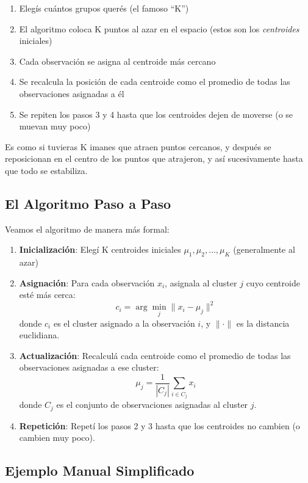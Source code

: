 \documentclass[12pt]{article}
\begin{document}
\begin{enumerate}
    \item Elegís cuántos grupos querés (el famoso ``K'')
    \item El algoritmo coloca K puntos al azar en el espacio (estos son los \textit{centroides} iniciales)
    \item Cada observación se asigna al centroide más cercano
    \item Se recalcula la posición de cada centroide como el promedio de todas las observaciones asignadas a él
    \item Se repiten los pasos 3 y 4 hasta que los centroides dejen de moverse (o se muevan muy poco)
\end{enumerate}

Es como si tuvieras K imanes que atraen puntos cercanos, y después se reposicionan en el centro de los puntos que atrajeron, y así sucesivamente hasta que todo se estabiliza.

\subsection{El Algoritmo Paso a Paso}

Veamos el algoritmo de manera más formal:

\begin{enumerate}
    \item \textbf{Inicialización}: Elegí K centroides iniciales $\mu_1, \mu_2, \ldots, \mu_K$ (generalmente al azar)

    \item \textbf{Asignación}: Para cada observación $x_i$, asignala al cluster $j$ cuyo centroide esté más cerca:
    \[
    c_i = \arg\min_{j} \|x_i - \mu_j\|^2
    \]
    donde $c_i$ es el cluster asignado a la observación $i$, y $\|\cdot\|$ es la distancia euclidiana.

    \item \textbf{Actualización}: Recalculá cada centroide como el promedio de todas las observaciones asignadas a ese cluster:
    \[
    \mu_j = \frac{1}{|C_j|} \sum_{i \in C_j} x_i
    \]
    donde $C_j$ es el conjunto de observaciones asignadas al cluster $j$.

    \item \textbf{Repetición}: Repetí los pasos 2 y 3 hasta que los centroides no cambien (o cambien muy poco).
\end{enumerate}

\subsection{Ejemplo Manual Simplificado}
\end{document}
